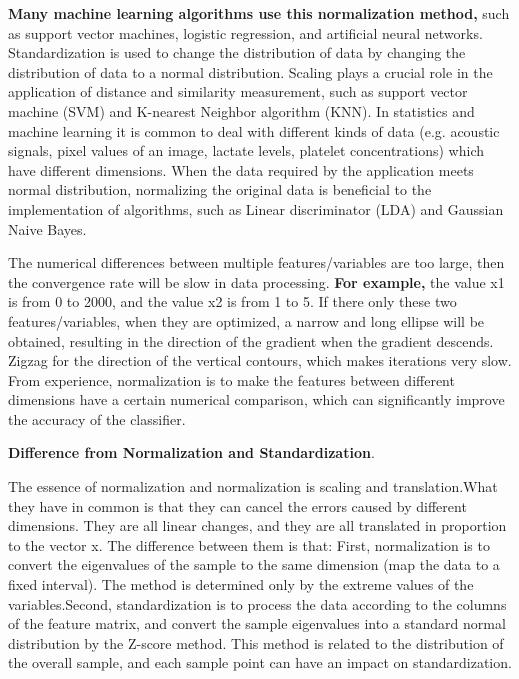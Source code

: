 \textbf{Many machine learning algorithms use this normalization method,} such as support vector machines, logistic regression, and artificial neural networks. Standardization is used to change the distribution of data by changing the distribution of data to a normal distribution. Scaling plays a crucial role in the application of distance and similarity measurement, such as support vector machine (SVM) and K-nearest Neighbor algorithm (KNN). In statistics and machine learning it is common to deal with different kinds of data (e.g. acoustic signals, pixel values of an image, lactate levels, platelet concentrations) which have different dimensions. When the data required by the application meets normal distribution, normalizing the original data is beneficial to the implementation of algorithms, such as Linear discriminator (LDA) and Gaussian Naive Bayes. 

The numerical differences between multiple features/variables are too large, then the convergence rate will be slow in data processing. \textbf{For example,} the value x1 is from 0 to 2000, and the value x2 is from 1 to 5. If there only these two features/variables, when they are optimized, a narrow and long ellipse will be obtained, resulting in the direction of the gradient when the gradient descends. Zigzag for the direction of the vertical contours, which makes iterations very slow. From experience, normalization is to make the features between different dimensions have a certain numerical comparison, which can significantly improve the accuracy of the classifier.


\textbf{Difference from Normalization and Standardization}. 

The essence of normalization and normalization is scaling and translation.What they have in common is that they can cancel the errors caused by different dimensions. They are all linear changes, and they are all translated in proportion to the vector x. The difference between them is that: First, normalization is to convert the eigenvalues of the sample to the same dimension (map the data to a fixed interval). The method is determined only by the extreme values of the variables.Second, standardization is to process the data according to the columns of the feature matrix, and convert the sample eigenvalues into a standard normal distribution by the Z-score method. This method is related to the distribution of the overall sample, and each sample point can have an impact on standardization.

